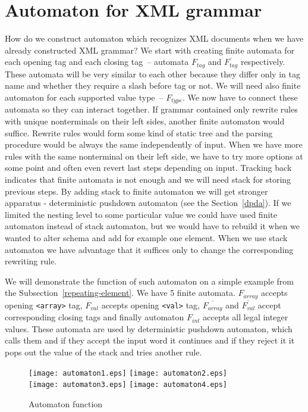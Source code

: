 \documentclass[12pt,notitlepage]{report}
\begin{document}
\section{Automaton for XML grammar}
\label{xml-automaton}
How do we construct automaton which recognizes XML documents when we have already constructed XML grammar? We start with creating finite automata for each opening tag and each closing tag~-- automata $F_{tag}$ and $\overline{F_{tag}}$ respectively. These automata will be very similar to each other because they differ only in tag name and whether they require a slash before tag or not. We will need also finite automaton for each supported value type~-- $F_{type}$. We now have to connect these automata so they can interact together. If grammar contained only rewrite rules with unique nonterminals on their left sides, another finite automaton would suffice. Rewrite rules would form some kind of static tree and the parsing procedure would be always the same independently of input. When we have more rules with the same nonterminal on their left side, we have to try more options at some point and often even revert last steps depending on input. Tracking back indicates that finite automata is not enough and we will need stack for storing previous steps. By adding stack to finite automaton we will get stronger apparatus - deterministic pushdown automaton (see the Section~\ref{dpda}). If we limited the nesting level to some particular value we could have used finite automaton instead of stack automaton, but we would have to rebuild it when we wanted to alter schema and add for example one element. When we use stack automaton we have advantage that it suffices only to change the corresponding rewriting rule.

We will demonstrate the function of such automaton on a simple example from the Subsection~\ref{repeating-element}. We have 5 finite automata. $F_{array}$ accepts opening \texttt{<array>} tag, $F_{val}$ accepts opening \texttt{<val>} tag, $\overline{F_{array}}$ and $\overline{F_{val}}$ accept corresponding closing tags and finally automaton $F_{int}$ accepts all legal integer values. These automata are used by deterministic pushdown automaton, which calls them and if they accept the input word it continues and if they reject it it pops out the value of the stack and tries another rule. 

\begin{figure}[htb]
 \begin{center}
  \texttt{[image: automaton1.eps]} 
  \texttt{[image: automaton2.eps]} \\ \vspace{0.75cm}
  \texttt{[image: automaton3.eps]}
  \texttt{[image: automaton4.eps]}
 \end{center}
 \caption{Automaton function}
 \label{automaton-function}
\end{figure}
\end{document}
